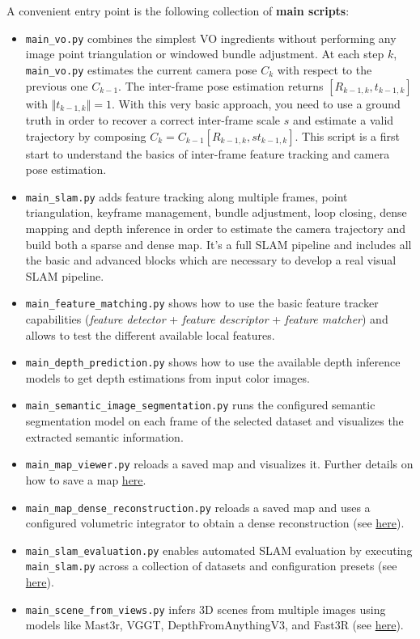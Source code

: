 \documentclass{article}
\begin{document}
A convenient entry point is the following collection of \textbf{main scripts}:
\begin{itemize}
\item 
\texttt{main\_vo.py} combines the simplest VO
ingredients without performing any image point triangulation or windowed
bundle adjustment. At each step \(k\), \texttt{main\_vo.py} estimates
the current camera pose \(C_k\) with respect to the previous one
\(C_{k-1}\). The inter-frame pose estimation returns
\([R_{k-1,k},t_{k-1,k}]\) with \(\Vert t_{k-1,k} \Vert=1\). With this
very basic approach, you need to use a ground truth in order to recover
a correct inter-frame scale \(s\) and estimate a valid trajectory by
composing \(C_k = C_{k-1} [R_{k-1,k}, s t_{k-1,k}]\). This script is a
first start to understand the basics of inter-frame feature tracking and
camera pose estimation.
\item
  \texttt{main\_slam.py} adds feature tracking along multiple frames,
  point triangulation, keyframe management, bundle adjustment, loop
  closing, dense mapping and depth inference in order to estimate the
  camera trajectory and build both a sparse and dense map. It's a full
  SLAM pipeline and includes all the basic and advanced blocks which are
  necessary to develop a real visual SLAM pipeline.
\item
  \texttt{main\_feature\_matching.py} shows how to use the basic feature
  tracker capabilities (\emph{feature detector} + \emph{feature
  descriptor} + \emph{feature matcher}) and allows to test the different
  available local features.
\item
  \texttt{main\_depth\_prediction.py} shows how to use the available
  depth inference models to get depth estimations from input color
  images.
\item
  \texttt{main\_semantic\_image\_segmentation.py} runs the configured
  semantic segmentation model on each frame of the selected dataset and
  visualizes the extracted semantic information.
\item
  \texttt{main\_map\_viewer.py} reloads a saved map and visualizes it.
  Further details on how to save a map
  \protect\hyperlink{reload-a-saved-map-and-relocalize-in-it}{here}.
\item
  \texttt{main\_map\_dense\_reconstruction.py} reloads a saved map and
  uses a configured volumetric integrator to obtain a dense
  reconstruction (see
  \protect\hyperlink{volumetric-reconstruction}{here}).
  \item
  \texttt{main\_slam\_evaluation.py} enables automated SLAM evaluation
  by executing \texttt{main\_slam.py} across a collection of datasets
  and configuration presets (see
  \protect\hyperlink{evaluating-slam}{here}).
  \item
  \texttt{main\_scene\_from\_views.py} infers 3D scenes from multiple
  images using models like Mast3r, VGGT, DepthFromAnythingV3, and Fast3R (see
  \protect\hyperlink{scene-from-views}{here}).
\end{itemize}
\end{document}
